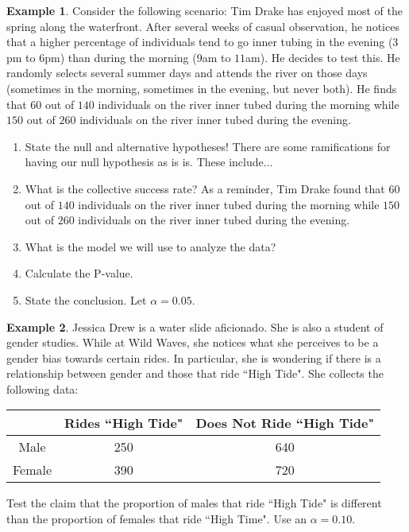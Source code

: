 \documentclass[12pt]{amsart}
\theoremstyle{definition}
\newtheorem{ex}{Example}
\begin{document}
\begin{ex}Consider the following scenario: Tim Drake has enjoyed most of the spring along the waterfront. After several weeks of casual observation, he notices that a higher percentage of individuals tend to go inner tubing in the evening ($3$pm to $6$pm) than during the morning ($9$am to $11$am). He decides to test this. He randomly selects several summer days and attends the river on those days (sometimes in the morning, sometimes in the evening, but never both). He finds that $60$ out of $140$ individuals on the river inner tubed during the morning while $150$ out of $260$ individuals on the river inner tubed during the evening.
\begin{enumerate}
	\item State the null and alternative hypotheses!
 \vfill
 \newpage
 \noindent There are some ramifications for having our null hypothesis as is is. These include...
	\vspace{2in}
	\item What is the collective success rate? As a reminder, Tim Drake found that $60$ out of $140$ individuals on the river inner tubed during the morning while $150$ out of $260$ individuals on the river inner tubed during the evening.\vfill
	\item What is the model we will use to analyze the data?\vfill
	\item Calculate the P-value.\vfill
	\item State the conclusion. Let $\alpha=0.05$. \vfill
\end{enumerate}\end{ex}
\newpage
\begin{ex} Jessica Drew is a water slide aficionado. She is also a student of gender studies. While at Wild Waves, she notices what she perceives to be a gender bias towards certain rides. In particular, she is wondering if there is a relationship between gender and those that ride ``High Tide". She collects the following data:

\begin{center}
	\begin{tabular}{|c|c|c|}
		\hline
		& Rides ``High Tide" & Does Not Ride ``High Tide" \\
		\hline
		Male & 250 & 640\\
		\hline
		Female & 390 & 720 \\
		\hline
	\end{tabular}
\end{center}
\noindent Test the claim that the proportion of males that ride ``High Tide" is different than the proportion of females that ride ``High Time". Use an $\alpha=0.10$.\end{ex}
\end{document}

